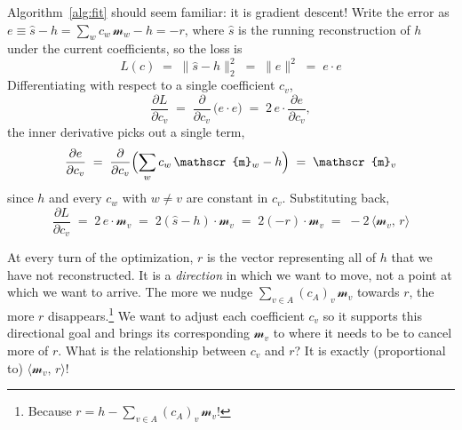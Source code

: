 \documentclass{article}
\begin{document}
Algorithm~\ref{alg:fit} should seem familiar: it is gradient descent! Write the error as \(e \equiv \hat{s} - h = \sum_w c_w\, \mathscr{m}_w - h = -r\), where \(\hat{s}\) is the running reconstruction of \(h\) under the current coefficients, so the loss is
\[ L(c) \;=\; \bigl\lVert \hat{s} - h\bigr\rVert_2^2 \;=\; \lVert e\rVert^2 \;=\; e \cdot e \]
Differentiating with respect to a single coefficient \(c_v\),
\[ \frac{\partial L}{\partial c_v} \;=\; \frac{\partial}{\partial c_v}\,\bigl(e \cdot e\bigr) \;=\; 2\, e \cdot \frac{\partial e}{\partial c_v}, \]
the inner derivative picks out a single term,
\[ \frac{\partial e}{\partial c_v} \;=\; \frac{\partial}{\partial c_v}\Bigl(\sum_w c_w\, \mathscr{m}_w - h\Bigr) \;=\; \mathscr{m}_v \]
since \(h\) and every \(c_w\) with \(w \neq v\) are constant in \(c_v\). Substituting back,
\[ \frac{\partial L}{\partial c_v} \;=\; 2\, e \cdot \mathscr{m}_v \;=\; 2(\hat{s}-h)\cdot \mathscr{m}_v \;=\; 2(-r)\cdot \mathscr{m}_v \;=\; -2\,\langle \mathscr{m}_v,\, r\rangle \]

At every turn of the optimization, \(r\) is the vector representing all of \(h\) that we have not reconstructed. It is a \textit{direction} in which we want to move, not a point at which we want to arrive. The more we nudge \(\sum_{v \in A}(c_A)_v\,\mathscr{m}_{v}\) towards \(r\), the more \(r\) disappears.\footnote{Because \(r = h - \sum_{v \in A}(c_A)_v\,\mathscr{m}_{v}\)!} We want to adjust each coefficient \(c_v\) so it supports this directional goal and brings its corresponding \(\mathscr{m}_v\) to where it needs to be to cancel more of \(r\). What is the relationship between \(c_v\) and \(r\)? It is exactly (proportional to) \(\langle \mathscr{m}_v,\, r\rangle\)!
\end{document}
